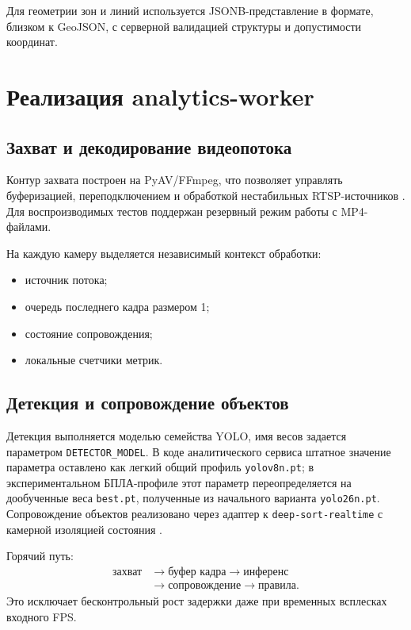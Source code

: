 Для геометрии зон и линий используется JSONB-представление в формате, близком к GeoJSON, с серверной валидацией структуры и допустимости координат.

\section{Реализация analytics-worker}

\subsection{Захват и декодирование видеопотока}

Контур захвата построен на PyAV/FFmpeg, что позволяет управлять буферизацией, переподключением и обработкой нестабильных RTSP-источников \cite{pyav_docs,ffmpeg_docs}. Для воспроизводимых тестов поддержан резервный режим работы с MP4-файлами.

На каждую камеру выделяется независимый контекст обработки:
\begin{itemize}
    \item источник потока;
    \item очередь последнего кадра размером 1;
    \item состояние сопровождения;
    \item локальные счетчики метрик.
\end{itemize}

\subsection{Детекция и сопровождение объектов}

Детекция выполняется моделью семейства YOLO, имя весов задается параметром \texttt{DETECTOR\_MODEL}. В коде аналитического сервиса штатное значение параметра оставлено как легкий общий профиль \texttt{yolov8n.pt}; в экспериментальном БПЛА-профиле этот параметр переопределяется на дообученные веса \texttt{best.pt}, полученные из начального варианта \texttt{yolo26n.pt}. Сопровождение объектов реализовано через адаптер к \texttt{deep-sort-realtime} с камерной изоляцией состояния \cite{wojke2017deepsort,deepsort_realtime}.

Горячий путь:
\begin{equation}
\begin{aligned}
\text{захват} &\rightarrow \text{буфер кадра} \rightarrow \text{инференс} \\
&\rightarrow \text{сопровождение} \rightarrow \text{правила}.
\end{aligned}
\end{equation}
Это исключает бесконтрольный рост задержки даже при временных всплесках входного FPS.

